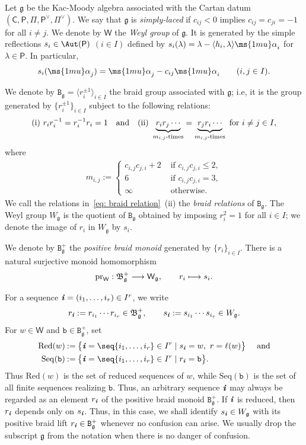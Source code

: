 \documentclass[12pt, leqno]{amsart}
\numberwithin{equation}{section}
\theoremstyle{plain}
\theoremstyle{definition}
\renewcommand{\le}{\leqslant}
\newcommand{\seteq}{\mathbin{:=}}
\newcommand{\g}{\mathfrak{g}}
\newcommand{\al}{{\ms{1mu}\alpha}}
\newcommand{\la}{\lambda}
\newcommand{\ii}{ \textbf{\textit{i}}}
\newcommand{\sfC}{\mathsf{C}}
\newcommand{\sfP}{\mathsf{P}}
\newcommand{\sfW}{\mathsf{W}}
\newcommand{\ttB}{\mathtt{B}}
\newcommand{\ttb}{\mathtt{b}}
\newcommand{\wl}{\sfP}
\newcommand{\weyl}{\sfW}
\newcommand{\lan}{\langle}
\newcommand{\ran}{\rangle}
\newcommand{\qtq}[1][{and}]{\quad\text{{#1}}\quad}
\newcommand{\bc}{\begin{cases}}
\newcommand{\ec}{\end{cases}}
\newcommand{\Ang}[1]{  \bigl\lan #1 \bigr\ran  }
\newcommand{\Red}{\mathrm{Red}}
\newcommand{\Seq}{\mathrm{Seq}}
\begin{document}
Let $\g$ be the Kac-Moody algebra associated with the Cartan datum $(\sfC,\wl,\Pi,\wl^\vee,\Pi^\vee)$.
We say that $\g$ is \emph{simply-laced} if $c_{ij}<0$ implies $c_{ij}=c_{ji}=-1$ for all $i\ne j$.
We denote by $\weyl$
the \emph{Weyl group} of $\g$. It is generated by the simple reflections $s_i\in\Aut(\wl)$ $(i \in I)$ defined by $s_i(\la) = \la - \lan h_i,\la \ran \al_i$ for
$\la \in \wl$.
In particular,
\begin{align} \label{eq: s_i action on simple}
s_i(\al_j)=\al_j-c_{ij}\al_i
\qquad (i,j\in I).
\end{align}

We denote by $\ttB_\g = \Ang{r_i^{\pm 1}}_{i \in I}$ the braid group associated with $\g$; i.e, it is the group generated by $\{ r_i^{\pm 1} \}_{i \in I}$
subject to the following relations:
\begin{align} \label{eq: braid relation}
{\rm (i)} \ r_{i}r_{i}^{-1} = r_{i}^{-1}r_{i}=1 \qtq
{\rm (ii)} \ \underbrace{r_{i}r_{j}\cdots}_{m_{i,j}\text{-times}} =\underbrace{r_{j}r_{i}\cdots}_{m_{i,j}\text{-times}}
\text{ for } i \ne j \in I,
\end{align}
where
\begin{align*}
m_{i,j} \seteq \bc
c_{i,j}c_{j,i} +2 & \text{ if } c_{i,j}c_{j,i} \le 2, \\
6  & \text{ if } c_{i,j}c_{j,i} =3, \\
\infty & \text{ otherwise.}
\ec
\end{align*}
We call the relations in~\eqref{eq: braid relation}~{\rm (ii)} the \emph{braid relations} of $\ttB_\g$.
The Weyl group $W_\g$ is the quotient of $\ttB_\g$ obtained by imposing
$r_i^2=1$ for all $i\in I$; we denote the image of $r_i$ in $W_\g$ by $s_i$.

We denote by $\ttB^+_\g$ the \emph{positive braid monoid} generated by
$\{r_i\}_{i\in I}$.  There is a natural surjective monoid homomorphism
\[
{\rm pr}_\sfW:\ttB^+_\g\longrightarrow \sfW_\g, \qquad r_i\longmapsto s_i.
\]

For a sequence $\ii=(i_1,\ldots,i_r)\in I^r$, we write
\[
r_\ii:=r_{i_1}\cdots r_{i_r}\in\ttB^+_\g, \qquad s_\ii:=s_{i_1}\cdots s_{i_r}\in W_\g.
\]
For $w\in\weyl$ and $\ttb\in\ttB^+_\g$, set
\begin{align*}
\Red(w) &\seteq \bigl\{\ii=\seq{i_1,\ldots,i_r}\in I^r \mid s_\ii=w,\ r=\ell(w)\bigr\} \quad \text{ and} \allowdisplaybreaks\\
\Seq(\ttb) &\seteq \bigl\{\ii=\seq{i_1,\ldots,i_r}\in I^r \mid r_\ii=\ttb\bigr\}.
\end{align*}
Thus $\Red(w)$ is the set of reduced sequences of $w$, while
$\Seq(\ttb)$ is the set of all finite sequences realizing $\ttb$.
Thus, an arbitrary sequence $\ii$ may always be regarded as an element
$r_\ii$ of the positive braid monoid $\ttB^+_\g$.
If $\ii$ is reduced, then $r_\ii$ depends only on $s_\ii$.
Thus, in this case, we shall identify $s_\ii\in W_\g$ with its
positive braid lift $r_\ii\in\ttB^+_\g$ whenever no confusion can arise.
We usually drop the subscript $\g$ from the notation when there is no
danger of confusion.
\end{document}
